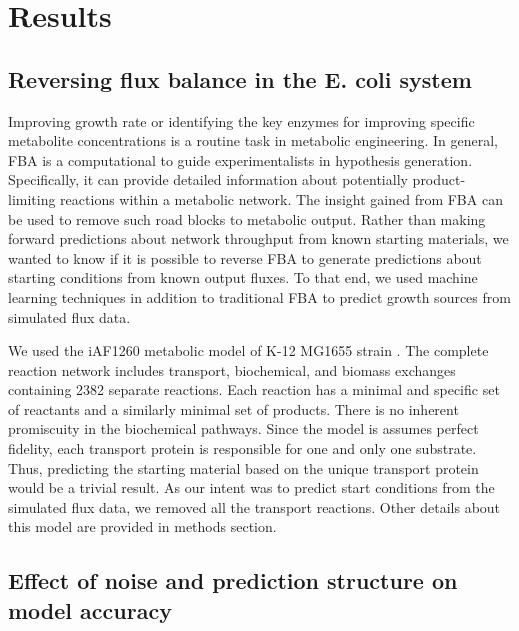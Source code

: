 \documentclass[12pt]{article}
\begin{document}
\section*{Results}
\subsection*{Reversing flux balance in the E. coli system}

Improving growth rate or identifying the key enzymes for improving specific metabolite concentrations is a routine task in metabolic engineering. In general, FBA is a computational to guide experimentalists in hypothesis generation. Specifically, it can provide detailed information about potentially product-limiting reactions within a metabolic network. The insight gained from FBA can be used to remove such road blocks to metabolic output. Rather than making forward predictions about network throughput from known starting materials, we wanted to know if it is possible to reverse FBA to generate predictions about starting conditions from known output fluxes. To that end, we used machine learning techniques in addition to traditional FBA to predict growth sources from simulated flux data.

We used the iAF1260 metabolic model of K-12 MG1655 strain \cite{Schellenbergeretal2010}. The complete reaction network includes transport, biochemical, and biomass exchanges containing 2382 separate reactions. Each reaction has a minimal and specific set of reactants and a similarly minimal set of products. There is no inherent promiscuity in the biochemical pathways. Since the model is assumes perfect fidelity, each transport protein is responsible for one and only one substrate. Thus, predicting the starting material based on the unique transport protein would be a trivial result. As our intent was to predict start conditions from the simulated flux data, we removed all the transport reactions.  Other details about this model are provided in methods section.

\subsection*{Effect of noise and prediction structure on model accuracy}
\end{document}
